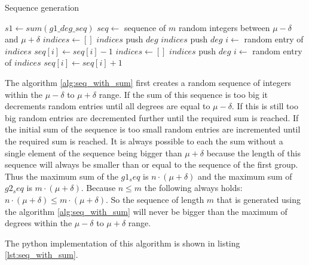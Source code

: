 \begin{algorithm}
\caption{Sequence generation}
\label{alg:seq_with_sum}
\begin{algorithmic}
\State $s1 \gets sum(g1\_deg\_seq)$
\State $seq \gets $ sequence of $m$ random integers between $\mu - \delta$ and $\mu + \delta$
        \State $indices \gets []$
                \State $indices$ push $deg$
            \EndIf
        \EndFor
                \State $indices$ push $deg$
            \EndIf
            \EndFor
        \EndIf
        \State $i \gets $ random entry of $indices$
        \State $seq[i] \gets seq[i] - 1$
    \Else
        \State $indices \gets []$
                \State $indices$ push $deg$
            \EndIf
        \EndFor
        \State $i \gets $ random entry of $indices$
        \State $seq[i] \gets seq[i] + 1$
    \EndIf
\EndWhile
\end{algorithmic}
\end{algorithm}

The algorithm \ref{alg:seq_with_sum} first creates a random sequence of integers within the $\mu - \delta$ to $\mu + \delta$ range. If the sum of this sequence is too big it decrements random entries until all degrees are equal to $\mu - \delta$. If this is still too big random entries are decremented further until the required sum is reached. If the initial sum of the sequence is too small random entries are incremented until the required sum is reached. It is always possible to each the sum without a single element of the sequence being bigger than $\mu + \delta$ because the length of this sequence will always be smaller than or equal to the sequence of the first group. Thus the maximum sum of the $g1_seq$ is $n \cdot (\mu + \delta)$ and the maximum sum of $g2_seq$ is $m \cdot (\mu + \delta)$. Because $n \leq m$ the following always holds: $n \cdot (\mu + \delta) \leq m \cdot (\mu + \delta)$. So the sequence of length $m$ that is generated using the algorithm \ref{alg:seq_with_sum} will never be bigger than the maximum of degrees within the $\mu - \delta$ to $\mu + \delta$ range.

The python implementation of this algorithm is shown in listing \ref{lst:seq_with_sum}.


